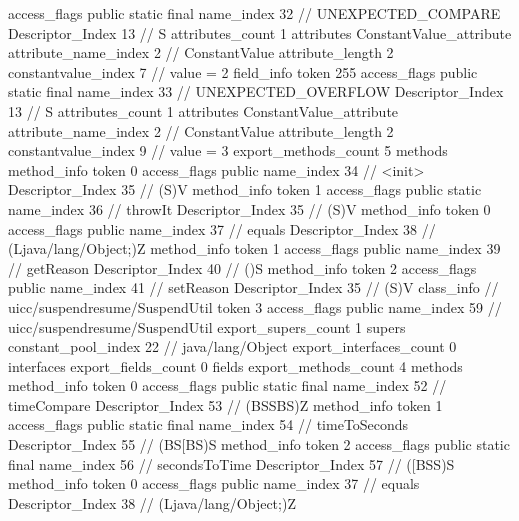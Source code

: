 {{{{{				access_flags	public static final
				name_index	32		// UNEXPECTED_COMPARE
				Descriptor_Index	13		// S
				attributes_count	1
				attributes {
				ConstantValue_attribute {
					attribute_name_index	2		// ConstantValue
					attribute_length	2
					constantvalue_index	7		// value = 2
				}
				}
			}
			field_info {
				token	255
				access_flags	public static final
				name_index	33		// UNEXPECTED_OVERFLOW
				Descriptor_Index	13		// S
				attributes_count	1
				attributes {
				ConstantValue_attribute {
					attribute_name_index	2		// ConstantValue
					attribute_length	2
					constantvalue_index	9		// value = 3
				}
				}
			}
			}
			export_methods_count	5
			methods {
				method_info {
					token	0
					access_flags	public
					name_index	34		// <init>
					Descriptor_Index	35		// (S)V
				}
				method_info {
					token	1
					access_flags	public static
					name_index	36		// throwIt
					Descriptor_Index	35		// (S)V
				}
				method_info {
					token	0
					access_flags	public
					name_index	37		// equals
					Descriptor_Index	38		// (Ljava/lang/Object;)Z
				}
				method_info {
					token	1
					access_flags	public
					name_index	39		// getReason
					Descriptor_Index	40		// ()S
				}
				method_info {
					token	2
					access_flags	public
					name_index	41		// setReason
					Descriptor_Index	35		// (S)V
				}
			}
		}
		class_info {		// uicc/suspendresume/SuspendUtil
			token	3
			access_flags	public
			name_index	59		// uicc/suspendresume/SuspendUtil
			export_supers_count	1
			supers {
				constant_pool_index	22		// java/lang/Object
			}
			export_interfaces_count	0
			interfaces {
			}
			export_fields_count	0
			fields {
			}
			export_methods_count	4
			methods {
				method_info {
					token	0
					access_flags	public static final
					name_index	52		// timeCompare
					Descriptor_Index	53		// (BSSBS)Z
				}
				method_info {
					token	1
					access_flags	public static final
					name_index	54		// timeToSeconds
					Descriptor_Index	55		// (BS[BS)S
				}
				method_info {
					token	2
					access_flags	public static final
					name_index	56		// secondsToTime
					Descriptor_Index	57		// ([BSS)S
				}
				method_info {
					token	0
					access_flags	public
					name_index	37		// equals
					Descriptor_Index	38		// (Ljava/lang/Object;)Z
				}
			}
		}
	}
}
